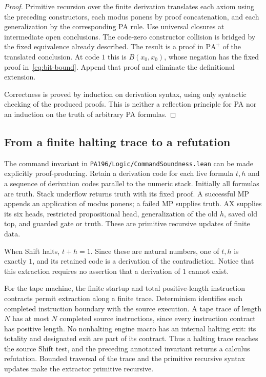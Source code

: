 \begin{proof}
Primitive recursion over the finite derivation translates each axiom
using the preceding constructors, each modus ponens by proof
concatenation, and each generalization by the corresponding PA rule.
Use universal closures at intermediate open conclusions.  The
code-zero constructor collision is bridged by the fixed equivalence
already described.  The result is a proof in $\mathrm{PA}^{+}$ of
the translated conclusion.  At code $1$ this is $B(x_0,x_0)$, whose
negation has the fixed proof in~\eqref{eq:bit-bound}.  Append that proof
and eliminate the definitional extension.

Correctness is proved by induction on derivation syntax, using only
syntactic checking of the produced proofs.  This is neither a
reflection principle for PA nor an induction on the truth of
arbitrary PA formulas.
\end{proof}

\subsection{From a finite halting trace to a refutation}

The command invariant in
\texttt{PA196/Logic/CommandSoundness.lean} can be made explicitly
proof-producing.  Retain a derivation code for each live formula $t,h$
and a sequence of derivation codes parallel to the numeric stack.
Initially all formulas are truth.  Stack underflow returns truth with
its fixed proof.  A successful MP appends an application of modus
ponens; a failed MP supplies truth.  AX supplies its six heads,
restricted propositional head, generalization of the old $h$, saved
old top, and guarded gate or truth.  These are primitive recursive
updates of finite data.

When Shift halts, $t+h=1$.  Since these are natural numbers, one of
$t,h$ is exactly $1$, and its retained code is a derivation of the
contradiction.  Notice that this extraction requires no assertion
that a derivation of $1$ cannot exist.

For the tape machine, the finite startup and total positive-length
instruction contracts permit extraction along a finite trace.
Determinism identifies each completed instruction boundary with the
source execution.  A tape trace of length $N$ has at most $N$
completed source instructions, since every instruction contract has
positive length.  No nonhalting engine macro has an internal halting
exit: its totality and designated exit are part of its contract.
Thus a halting trace reaches the source Shift test, and the preceding
annotated invariant returns a calculus refutation.  Bounded traversal
of the trace and the primitive recursive syntax updates make the
extractor primitive recursive.

